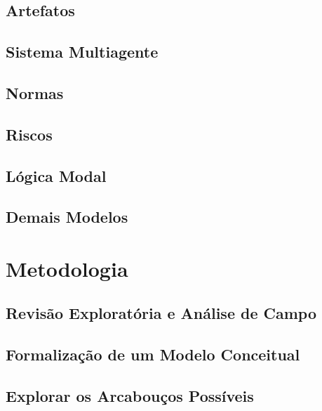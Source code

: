 \documentclass[openright]{normas-utf-tex} %
\begin{document}
	\section{Artefatos} \label{artefact}
		
	\section{Sistema Multiagente} \label{sma}
		
	\section{Normas} \label{normasdastani}
		
	\section{Riscos} \label{risksec}
		
	\section{Lógica Modal} \label{logic}
		
	\section{Demais Modelos}
		
		 		
				
		
	
\chapter{Metodologia}
\label{chap:metod}
	
    \section{Revisão Exploratória e Análise de Campo}\label{revexpanalcamp} 
          
    \section{Formalização de um Modelo Conceitual}\label{modconceitual}
        
    \section{Explorar os Arcabouços Possíveis} \label{possarc} 
                         
\end{document}
